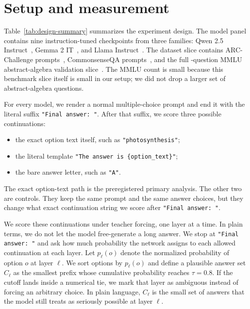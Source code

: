 \section{Setup and measurement}

Table~\ref{tab:design-summary} summarizes the experiment design. The model panel contains nine instruction-tuned checkpoints from three families: Qwen 2.5 Instruct~\citep{qwen25card}, Gemma 2 IT~\citep{gemma2card}, and Llama Instruct~\citep{llama3herd}. The dataset slice contains \ArcPromptCount{} ARC-Challenge prompts~\citep{clark2018arc}, \CsqaPromptCount{} CommonsenseQA prompts~\citep{talmor2019commonsenseqa}, and the full \MmluPromptCount{}-question MMLU abstract-algebra validation slice~\citep{hendrycks2021mmlu}. The MMLU count is small because this benchmark slice itself is small in our setup; we did not drop a larger set of abstract-algebra questions.

For every model, we render a normal multiple-choice prompt and end it with the literal suffix \texttt{"Final answer: "}. After that suffix, we score three possible continuations:
\begin{itemize}[leftmargin=1.2em, itemsep=0.2em, topsep=0.35em]
\item the exact option text itself, such as \texttt{"photosynthesis"};
\item the literal template \texttt{"The answer is \{option\_text\}"};
\item the bare answer letter, such as \texttt{"A"}.
\end{itemize}
The exact option-text path is the preregistered primary analysis. The other two are controls. They keep the same prompt and the same answer choices, but they change what exact continuation string we score after \texttt{"Final answer: "}.

\begin{table}[t]
\centering
\small

\caption{\textbf{Reader-facing summary of the experiment design.} The main question stays fixed throughout the paper: scoring the exact option text is primary, the two alternative continuation strings are controls, and identity versus reverse answer order is kept paired on the same example subset.}
\label{tab:design-summary}
\end{table}

We score these continuations under teacher forcing, one layer at a time. In plain terms, we do not let the model free-generate a long answer. We stop at \texttt{"Final answer: "} and ask how much probability the network assigns to each allowed continuation at each layer. Let $p_\ell(o)$ denote the normalized probability of option $o$ at layer $\ell$. We sort options by $p_\ell(o)$ and define a plausible answer set $C_\ell$ as the smallest prefix whose cumulative probability reaches $\tau = 0.8$. If the cutoff lands inside a numerical tie, we mark that layer as ambiguous instead of forcing an arbitrary choice. In plain language, $C_\ell$ is the small set of answers that the model still treats as seriously possible at layer $\ell$.

